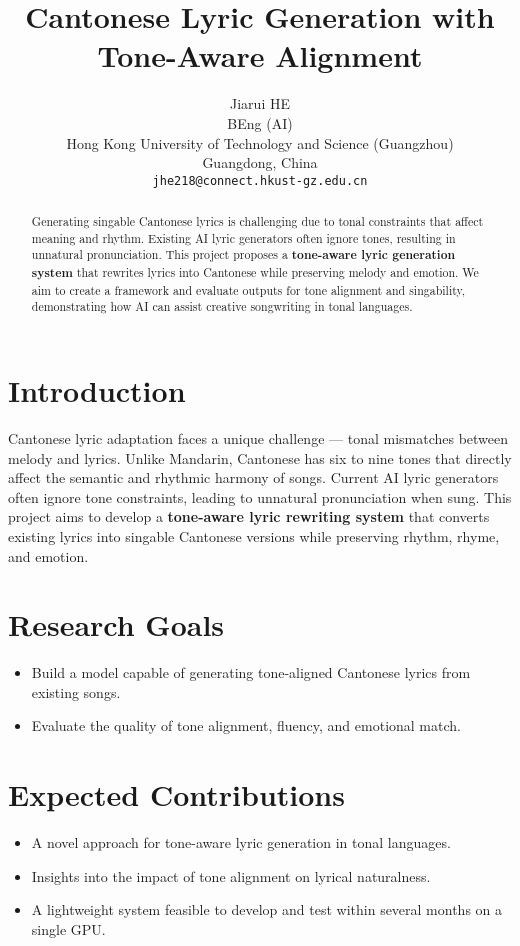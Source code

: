 \documentclass{article}
\title{Cantonese Lyric Generation with Tone-Aware Alignment}
\author{%
    Jiarui HE \\
    BEng (AI) \\
    Hong Kong University of Technology and Science (Guangzhou) \\
    Guangdong, China \\
    \texttt{jhe218@connect.hkust-gz.edu.cn} \\
}
\begin{document}
\maketitle

\begin{abstract}
Generating singable Cantonese lyrics is challenging due to tonal constraints that affect meaning and rhythm. Existing AI lyric generators often ignore tones, resulting in unnatural pronunciation. This project proposes a \textbf{tone-aware lyric generation system} that rewrites lyrics into Cantonese while preserving melody and emotion. We aim to create a framework and evaluate outputs for tone alignment and singability, demonstrating how AI can assist creative songwriting in tonal languages.
\end{abstract}

\section{Introduction}
Cantonese lyric adaptation faces a unique challenge --- tonal mismatches between melody and lyrics. Unlike Mandarin, Cantonese has six to nine tones that directly affect the semantic and rhythmic harmony of songs. Current AI lyric generators often ignore tone constraints, leading to unnatural pronunciation when sung. This project aims to develop a \textbf{tone-aware lyric rewriting system} that converts existing lyrics into singable Cantonese versions while preserving rhythm, rhyme, and emotion.

\section{Research Goals}
\begin{itemize}
    \item Build a model capable of generating tone-aligned Cantonese lyrics from existing songs.
    \item Evaluate the quality of tone alignment, fluency, and emotional match.
\end{itemize}

\section{Expected Contributions}
\begin{itemize}
    \item A novel approach for tone-aware lyric generation in tonal languages.
    \item Insights into the impact of tone alignment on lyrical naturalness.
    \item A lightweight system feasible to develop and test within several months on a single GPU.
\end{itemize}
\end{document}
